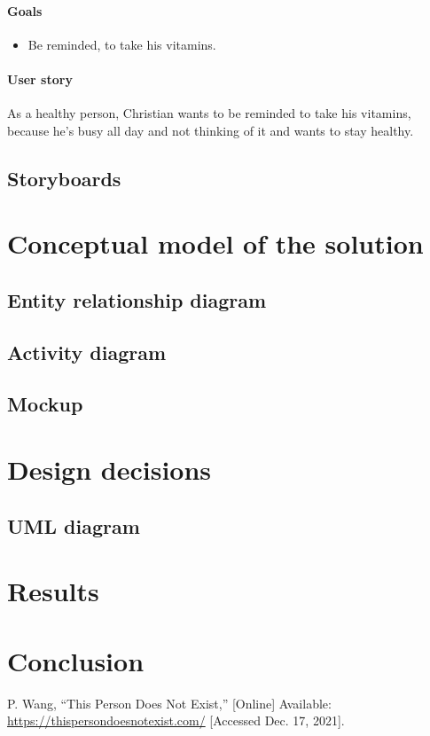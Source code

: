 \documentclass[conference]{IEEEtran}
\begin{document}
\paragraph*{Goals}
\begin{itemize}[leftmargin=1.25cm]
	\item Be reminded, to take his vitamins.

\end{itemize}

\paragraph*{User story}
As a healthy person, Christian wants to be reminded to take his vitamins, because he's busy all day and not thinking of it and wants to stay healthy.

\subsection{Storyboards}

%


\section{Conceptual model of the solution}

\subsection{Entity relationship diagram}

\subsection{Activity diagram}

\subsection{Mockup}

\section{Design decisions}

\subsection{UML diagram}

\section{Results}

\section{Conclusion}


\begin{thebibliography}{00}	
	 P. Wang, ``This Person Does Not Exist,'' [Online] Available: \url{https://thispersondoesnotexist.com/} [Accessed Dec. 17, 2021].
\end{thebibliography}
\end{document}
